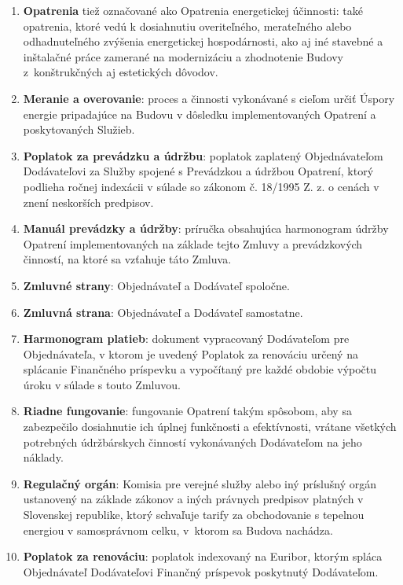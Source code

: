 \begin{multicols}{2}
\begin{enumerate}
\item\textbf{Opatrenia} tiež označované ako Opatrenia energetickej účinnosti:
také opatrenia, ktoré vedú k dosiahnutiu overiteľného, merateľného alebo
odhadnuteľného zvýšenia energetickej hospodárnosti, ako aj iné stavebné
a inštalačné práce zamerané na modernizáciu a zhodnotenie Budovy
z~konštrukčných aj estetických dôvodov.

\item\textbf{Meranie a overovanie}: proces a činnosti vykonávané s cieľom
určiť Úspory energie pripadajúce na Budovu v dôsledku implementovaných
Opatrení a poskytovaných Služieb.

\item\textbf{Poplatok za prevádzku a údržbu}: poplatok zaplatený
Objednávateľom Dodávateľovi za Služby spojené s Prevádzkou a údržbou
Opatrení, ktorý podlieha ročnej indexácii v súlade so zákonom č. 18/1995
Z. z. o cenách v znení neskorších predpisov.

\item\textbf{Manuál prevádzky a údržby}: príručka obsahujúca harmonogram
údržby Opatrení implementovaných na základe tejto Zmluvy a prevádzkových
činností, na ktoré sa vzťahuje táto Zmluva.

\item\textbf{Zmluvné strany}: Objednávateľ a Dodávateľ spoločne.

\item\textbf{Zmluvná strana}: Objednávateľ a Dodávateľ samostatne.

\item\textbf{Harmonogram platieb}: dokument vypracovaný Dodávateľom pre
Objednávateľa, v ktorom je uvedený Poplatok za renováciu určený na
splácanie Finančného príspevku a vypočítaný pre každé obdobie výpočtu
úroku v súlade s touto Zmluvou.

\item\textbf{Riadne fungovanie}: fungovanie Opatrení takým spôsobom, aby sa
zabezpečilo dosiahnutie ich úplnej funkčnosti a efektívnosti, vrátane
všetkých potrebných údržbárskych činností vykonávaných Dodávateľom na
jeho náklady.

\item\textbf{Regulačný orgán}: Komisia pre verejné služby alebo iný príslušný
orgán ustanovený na základe zákonov a iných právnych predpisov platných
v Slovenskej republike, ktorý schvaľuje tarify za obchodovanie s
tepelnou energiou v samosprávnom celku, v~ktorom sa Budova nachádza.

\item\textbf{Poplatok za renováciu}: poplatok indexovaný na Euribor, ktorým
spláca Objednávateľ Dodávateľovi Finančný príspevok poskytnutý
Dodávateľom.


\end{enumerate}
\end{multicols}
